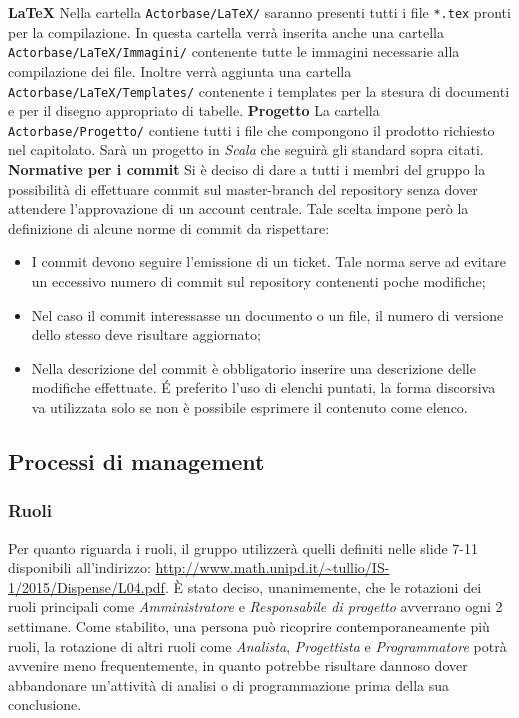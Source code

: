 \documentclass[a4paper]{article}
\begin{document}
	\textbf{LaTeX}
	Nella cartella \verb|Actorbase/LaTeX/| saranno presenti tutti i file \verb|*.tex| pronti per la compilazione. In questa cartella verrà inserita
	anche una cartella\\ \verb|Actorbase/LaTeX/Immagini/| contenente tutte le immagini necessarie alla compilazione dei file.
	Inoltre verrà aggiunta una cartella \verb|Actorbase/LaTeX/Templates/| contenente i templates per la stesura di documenti e per il
	disegno appropriato di tabelle.
	\textbf{Progetto}
	La cartella \verb|Actorbase/Progetto/| contiene tutti i file che compongono il prodotto richiesto nel capitolato. Sarà  un progetto in
	\emph{Scala} che seguirà gli standard sopra citati.
	\textbf{Normative per i commit}
		Si è deciso di dare a tutti i membri del gruppo la possibilità di effettuare commit sul master-branch del repository
		senza dover attendere l'approvazione di un account centrale. Tale scelta impone però la definizione di alcune norme
		di commit da rispettare:
		\begin{itemize}
			\item I commit devono seguire l'emissione di un ticket. Tale norma serve ad evitare un eccessivo numero di
			 commit sul repository contenenti poche modifiche;
			\item Nel caso il commit interessasse un documento o un file, il numero di versione dello stesso deve risultare
			 aggiornato;
			\item Nella descrizione del commit è obbligatorio inserire una descrizione delle modifiche effettuate. \'E preferito
			l'uso di elenchi puntati, la forma discorsiva va utilizzata solo se non è possibile esprimere il contenuto come
			elenco.
		\end{itemize}
	\subsection{Processi di management}
	\subsubsection{Ruoli}
		Per quanto riguarda i ruoli, il gruppo utilizzerà quelli definiti nelle slide 7-11 disponibili all'indirizzo:
		\url{http://www.math.unipd.it/~tullio/IS-1/2015/Dispense/L04.pdf}. È stato deciso, unanimemente, che le rotazioni dei ruoli principali
		come \emph{Amministratore} e \emph{Responsabile di progetto} avverrano ogni 2 settimane. Come stabilito, una persona può ricoprire
		contemporaneamente più ruoli, la rotazione di altri ruoli come \emph{Analista}, \emph{Progettista} e \emph{Programmatore} potrà avvenire
		meno frequentemente, in quanto potrebbe risultare dannoso dover abbandonare un'attività di analisi o di programmazione prima della sua
		conclusione.
\end{document}
